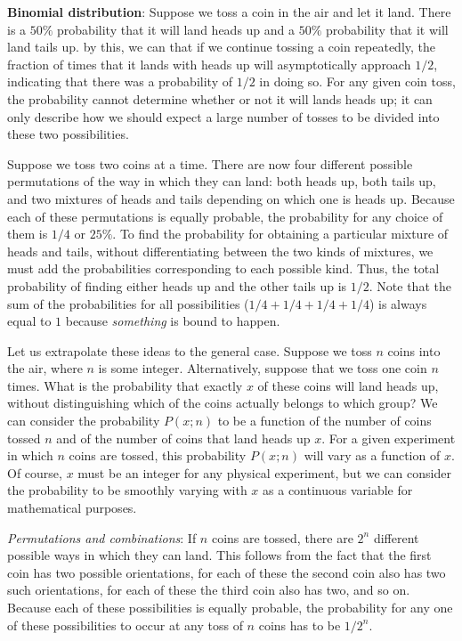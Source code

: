 \documentclass[a4paper,10pt]{article}
\begin{document}
{\noindent}\textbf{Binomial distribution}: Suppose we toss a coin in the air and let it land. There is a $50\%$ probability that it will land heads up and a $50\%$ probability that it will land tails up. by this, we can that if we continue tossing a coin repeatedly, the fraction of times that it lands with heads up will asymptotically approach $1/2$, indicating that there was a probability of $1/2$ in doing so. For any given coin toss, the probability cannot determine whether or not it will lands heads up; it can only describe how we should expect a large number of tosses to be divided into these two possibilities.

{\noindent}Suppose we toss two coins at a time. There are now four different possible permutations of the way in which they can land: both heads up, both tails up, and two mixtures of heads and tails depending on which one is heads up. Because each of these permutations is equally probable, the probability for any choice of them is $1/4$ or $25\%$. To find the probability for obtaining a particular mixture of heads and tails, without differentiating between the two kinds of mixtures, we must add the probabilities corresponding to each possible kind. Thus, the total probability of finding either heads up and the other tails up is $1/2$. Note that the sum of the probabilities for all possibilities ($1/4+1/4+1/4+1/4$) is always equal to $1$ because \textit{something} is bound to happen.

{\noindent}Let us extrapolate these ideas to the general case. Suppose we toss $n$ coins into the air, where $n$ is some integer. Alternatively, suppose that we toss one coin $n$ times. What is the probability that exactly $x$ of these coins will land heads up, without distinguishing which of the coins actually belongs to which group? We can consider the probability $P(x;n)$ to be a function of the number of coins tossed $n$ and of the number of coins that land heads up $x$. For a given experiment in which $n$ coins are tossed, this probability $P(x;n)$ will vary as a function of $x$. Of course, $x$ must be an integer for any physical experiment, but we can consider the probability to be smoothly varying with $x$ as a continuous variable for mathematical purposes.

{\noindent}\textit{Permutations and combinations}: If $n$ coins are tossed, there are $2^n$ different possible ways in which they can land. This follows from the fact that the first coin has two possible orientations, for each of these the second coin also has two such orientations, for each of these the third coin also has two, and so on. Because each of these possibilities is equally probable, the probability for any one of these possibilities to occur at any toss of $n$ coins has to be $1/2^n$.
\end{document}

